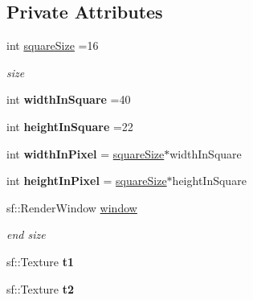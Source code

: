 \subsection*{Private Attributes}
\begin{DoxyCompactItemize}
\item 
\mbox{\label{class_snake_ab37f493e314b7d3b1c97ccafb2f5ad4d}} 
int \mbox{\hyperlink{class_snake_ab37f493e314b7d3b1c97ccafb2f5ad4d}{square\+Size}} =16
\begin{DoxyCompactList}\small\item\em size \end{DoxyCompactList}\item 
\mbox{\label{class_snake_a2d794fe10a4ffeb078c997aca5adb288}} 
int {\bfseries width\+In\+Square} =40
\item 
\mbox{\label{class_snake_af535e6a6dbd8b04476b3bf69057a389e}} 
int {\bfseries height\+In\+Square} =22
\item 
\mbox{\label{class_snake_af1c6be49728b83438c1d2728498a60b2}} 
int {\bfseries width\+In\+Pixel} = \mbox{\hyperlink{class_snake_ab37f493e314b7d3b1c97ccafb2f5ad4d}{square\+Size}}$\ast$width\+In\+Square
\item 
\mbox{\label{class_snake_a54de694c64a86c320b203feb0c43e569}} 
int {\bfseries height\+In\+Pixel} = \mbox{\hyperlink{class_snake_ab37f493e314b7d3b1c97ccafb2f5ad4d}{square\+Size}}$\ast$height\+In\+Square
\item 
sf\+::\+Render\+Window \mbox{\hyperlink{class_snake_ab0352383bcd926822a8567a78d51ad13}{window}}
\begin{DoxyCompactList}\small\item\em end size \end{DoxyCompactList}\item 
\mbox{\label{class_snake_a20ff62446c343ce055179e0640ba3239}} 
sf\+::\+Texture {\bfseries t1}
\item 
\mbox{\label{class_snake_ad359b3c1abd4119d48711cd9c589025d}} 
sf\+::\+Texture {\bfseries t2}
\item 
\mbox{\label{class_snake_aaa63311fb7597b507b4dfe9c960b2f4b}} 

\end{DoxyCompactItemize}
